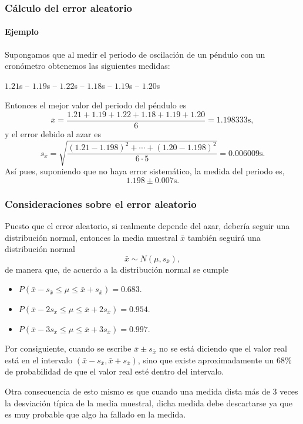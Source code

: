 \begin{frame}
	\frametitle{Cálculo del error aleatorio}
	\framesubtitle{Ejemplo}
	Supongamos que al medir el periodo de oscilación de un péndulo con un cronómetro obtenemos las siguientes medidas:
	\begin{center}
		$1.21$s -- $1.19$s -- $1.22$s -- $1.18$s -- $1.19$s -- $1.20$s
	\end{center}
	
	Entonces el mejor valor del periodo del péndulo es 
	\[
		\bar x = \frac{1.21+1.19+1.22+1.18+1.19+1.20}{6} =  1.198333\mbox{s},
	\] 
	y el error debido al azar es
	\[
		s_{\bar x} = \sqrt{\frac{(1.21-1.198)^2+\cdots +(1.20-1.198)^2}{6\cdot 5}} = 0.006009\mbox{s}.
	\]
	Así pues, suponiendo que no haya error sistemático, la medida del periodo es, 
	\[
		1.198\pm 0.007\mbox{s}.
	\]
\end{frame}


\begin{frame}
	\frametitle{Consideraciones sobre el error aleatorio}
	Puesto que el error aleatorio, si realmente depende del azar, debería seguir una distribución normal, entonces la media
	muestral $\bar x$ también seguirá una distribución normal
	\[
		\bar x\sim N(\mu,s_{\bar x}),
	\]
	de manera que, de acuerdo a la distribución normal se cumple
	\begin{itemize}
		\item $P(\bar x-s_{\bar x}\leq \mu\leq \bar x+s_{\bar x})=0.683$.
		\item $P(\bar x-2s_{\bar x}\leq \mu\leq \bar x+2s_{\bar x})=0.954$.
		\item $P(\bar x-3s_{\bar x}\leq \mu\leq \bar x+3s_{\bar x})=0.997$.
	\end{itemize}
	
	Por consiguiente, cuando se escribe $\bar x\pm s_{\bar x}$ no se está diciendo que el valor real está en el intervalo
	$(\bar x-s_{\bar x},\bar x+s_{\bar x})$, sino que existe aproximadamente un $68\%$ de probabilidad de que el valor real
	esté dentro del intervalo. 
	
	Otra consecuencia de esto mismo es que cuando una medida dista más de 3 veces la desviación típica de la media
	muestral, dicha medida debe descartarse ya que es muy probable que algo ha fallado en la medida. 
\end{frame}


